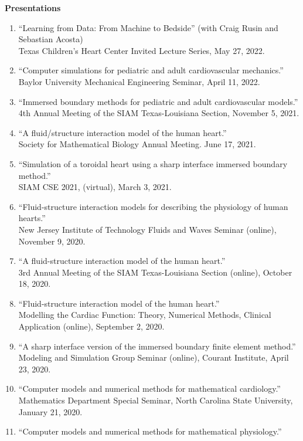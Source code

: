 \documentclass{article} %
\begin{document}
\vspace{0.5cm}
\noindent
{\bf \large Presentations}
\begin{enumerate}
\item ``Learning from Data: From Machine to Bedside'' (with Craig Rusin and Sebastian Acosta) \\
Texas Children's Heart Center Invited Lecture Series, May 27, 2022.
\item ``Computer simulations for pediatric and adult cardiovascular mechanics.'' \\
Baylor University Mechanical Engineering Seminar, April 11, 2022.
\item ``Immersed boundary methods for pediatric and adult cardiovascular models.''\\
4th Annual Meeting of the SIAM Texas-Louisiana Section, November 5, 2021.
\item ``A fluid/structure interaction model of the human heart.'' \\
Society for Mathematical Biology Annual Meeting.  June 17, 2021.
\item ``Simulation of a toroidal heart using a sharp interface immersed boundary method.'' \\
SIAM CSE 2021, (virtual), March 3, 2021.
\item ``Fluid-structure interaction models for describing the physiology of human hearts.'' \\ New Jersey Institute of Technology Fluids and Waves Seminar (online), November 9, 2020.
\item ``A fluid-structure interaction model of the human heart.'' \\ 3rd Annual Meeting of the SIAM Texas-Louisiana Section (online), October 18, 2020.
\item ``Fluid-structure interaction model of the human heart.'' \\
Modelling the Cardiac Function: Theory, Numerical Methods, Clinical Application (online), September 2, 2020.
\item ``A sharp interface version of the immersed boundary finite element method.'' \\
Modeling and Simulation Group Seminar (online), Courant Institute, April 23, 2020.
\item ``Computer models and numerical methods for mathematical cardiology.'' \\
Mathematics Department Special Seminar, North Carolina State University, January 21, 2020.
\item ``Computer models and numerical methods for mathematical physiology.'' \\

\end{enumerate}
\end{document}
